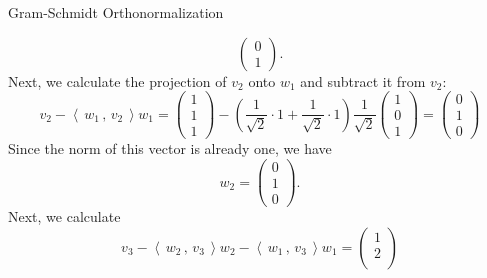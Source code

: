 \documentclass[smaller,hyperref={CJKbookmarks=true}]{beamer}
\newcommand{\scp}[2]{\left\langle\,#1\,,\,#2\,\right\rangle} \newcommand{\scpp}{\langle\,\cdot\,,\,\cdot\,\rangle}
\begin{document}
\begin{frame}{Gram-Schmidt Orthonormalization}
\begin{spacing}{0.9}
\[\begin{pmatrix}
                          0 \\
                          1
                        \end{pmatrix}.\]
Next, we calculate the projection of $v_2$ onto $w_1$ and subtract it from $v_2$:
\[v_2-\scp{w_1}{v_2}w_1=\begin{pmatrix}
                          1 \\
                          1 \\
                          1
                        \end{pmatrix}-\left(\frac{1}{\sqrt{2}}\cdot1+\frac{1}{\sqrt{2}}\cdot1\right)\frac{1}{\sqrt{2}}\begin{pmatrix}
                                                                                                                        1 \\
                                                                                                                        0 \\
                                                                                                                        1
                                                                                                                      \end{pmatrix}=\begin{pmatrix}
                                                                                                                                      0 \\
                                                                                                                                      1 \\
                                                                                                                                      0
                                                                                                                                    \end{pmatrix}\]
\newpage
Since the norm of this vector is already one, we have
\[w_2=\begin{pmatrix}
        0 \\
        1 \\
        0
      \end{pmatrix}.\]
Next, we calculate
\[v_3-\scp{w_2}{v_3}w_2-\scp{w_1}{v_3}w_1=\begin{pmatrix}
                                            1 \\
                                            2 \\

\end{pmatrix}\]
\end{spacing}
\end{frame}
\end{document}
